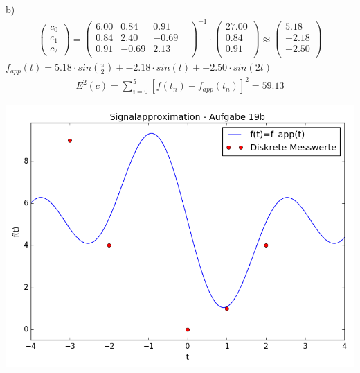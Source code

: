 	b) \newline
	\begin{align*}
	\left(\begin{matrix}c_0\\c_1\\c_2\end{matrix}\right) =
	\left(\begin{matrix}
			6.00 & 0.84 & 0.91 & \\
			0.84 & 2.40 & -0.69 & \\
			0.91 & -0.69 & 2.13 & \\
	\end{matrix}\right)^{-1} \cdot
	\left(\begin{matrix}
			27.00\\
			0.84\\
			0.91\\
	\end{matrix}\right) \approx
	\left(\begin{matrix}
			5.18\\
			-2.18\\
			-2.50\\
	\end{matrix}\right)
	\end{align*}
	$f_{app}(t) = 5.18 \cdot sin(\frac{\pi}{2}) + -2.18 \cdot sin(t) + -2.50 \cdot sin(2t) $
	\begin{align*}
			E^2(c) = \sum_{i=0}^5 \left[ f(t_n) - f_{app}(t_n)\right]^2 = 59.13
	\end{align*}

	\includegraphics[scale=0.8]{A19b.png}

